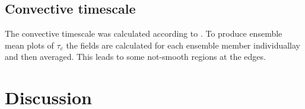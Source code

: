 \documentclass[a4paper, 12pt]{article}
\begin{document}
\subsection{Convective timescale}
The convective timescale was calculated according to \cite{Flack2016}. To produce ensemble mean plots of $\tau_c$ the fields are calculated for each ensemble member individuallay and then averaged. This leads to some not-smooth regions at the edges. 

\section{Discussion}



{\small
 }
\end{document}
